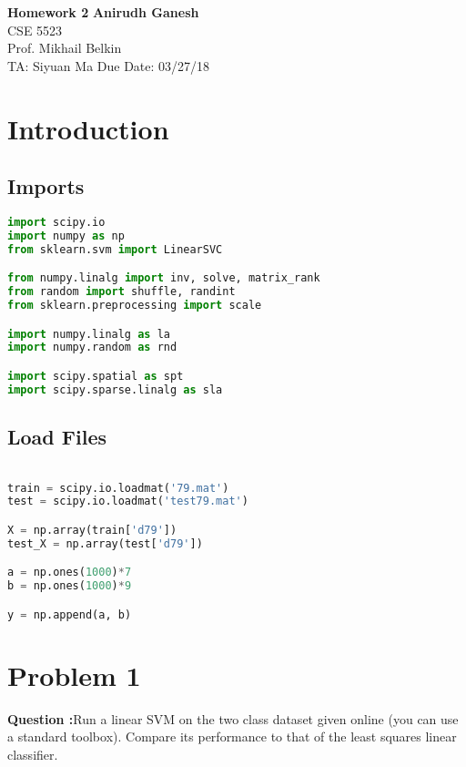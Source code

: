\documentclass[a4paper, 11pt]{article}
\begin{document}
\noindent
\large\textbf{Homework 2} \hfill \textbf{Anirudh Ganesh} \\
\normalsize CSE 5523  \\
Prof. Mikhail Belkin \\
TA: Siyuan Ma \hfill Due Date: 03/27/18

\section*{Introduction}

\subsection*{Imports}
\begin{lstlisting}[language=Python]
import scipy.io
import numpy as np
from sklearn.svm import LinearSVC

from numpy.linalg import inv, solve, matrix_rank
from random import shuffle, randint
from sklearn.preprocessing import scale

import numpy.linalg as la
import numpy.random as rnd

import scipy.spatial as spt
import scipy.sparse.linalg as sla

\end{lstlisting}

\subsection*{Load Files}

\begin{lstlisting}[language=Python]

train = scipy.io.loadmat('79.mat')
test = scipy.io.loadmat('test79.mat')

X = np.array(train['d79'])
test_X = np.array(test['d79'])

a = np.ones(1000)*7
b = np.ones(1000)*9

y = np.append(a, b)

\end{lstlisting}

\clearpage

\section*{Problem 1}

\textbf{Question :}Run a linear SVM on the two class dataset given online (you can use a standard toolbox).  Compare its performance to that of the least squares linear classifier.
\end{document}
